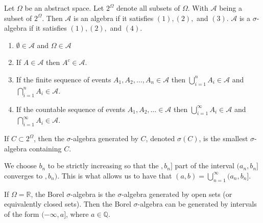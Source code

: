 \documentclass[../main.tex]{subfiles}
\begin{document}
\begin{definition}
Let $\Omega$ be an abstract space. Let $2^{\Omega}$ denote all subsets of $\Omega$. With $\mathcal{A}$ being a subset of $2^\Omega$. Then $\mathcal{A}$ is an algebra if it satisfies $(1),(2),$ and $(3)$. $\mathcal{A}$ is a $\sigma$-algebra if it satisfies $(1), (2),$ and $(4)$.
\begin{enumerate}
    \item $\emptyset \in \mathcal{A}$ and $\Omega \in \mathcal{A}$
    \item If $ A \in \mathcal{A}$ then $A^c \in \mathcal{A}$.
    \item If the finite sequence of events $A_1, A_2, \dots ,A_n \in \mathcal{A}$ then $\bigcup^n_{i=1}{A_i} \in \mathcal{A}$ and $\bigcap^n_{i=1}{A_i} \in \mathcal{A}$.
    \item If the countable sequence of events $A_1, A_2, \dots \in \mathcal{A}$ then $\bigcup^\infty_{i=1}{A_i} \in \mathcal{A}$ and $ \bigcap^\infty_{i=1}{A_i} \in \mathcal{A}    $. 
\end{enumerate}
    
\end{definition}



\begin{remark}
If $ C \subset 2^\Omega$, then the $\sigma$-algebra generated by $C$, denoted $ \sigma(C) $, is the smallest $ \sigma $-algebra containing $C$.
\end{remark}

We choose $b_n$ to be strictly increasing so that the $ ,b_n]$ part of the interval $ (a_n, b_n] $ converges to $ , b_n)$. This is what allows us to have that $(a,b) = \bigcup^\infty_{n=1}{(a_n, b_n]}$. 



\begin{theorem}
If $\Omega = \mathbb{R}$, the Borel $\sigma$-algebra is the $\sigma$-algebra generated by open sets (or equivalently closed sets). Then the Borel $\sigma $-algebra can be generated by intervals of the form $ (-\infty, a] $, where $ a \in \mathbb{Q} $.
\end{theorem}
\end{document}
